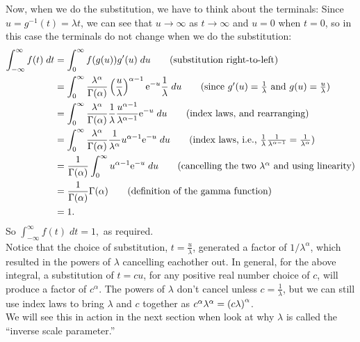 \noindent Now, when we do the substitution, we have to think about the terminals: Since $u = g^{-1}(t) = \lambda t$, we can see that $u \rightarrow \infty$ as $t \rightarrow \infty$ and $u = 0$ when $t = 0$, so in this case the terminals do not change when we do the substitution: 
\begin{align*}
\int_{-\infty}^\infty f(t) \; dt & = \int_0^\infty f(g(u))g'(u) \; du \tag{substitution right-to-left} \\
	& = \int_0^\infty \frac{\lambda^\alpha}{\Gamma(\alpha)}\brac{\frac{u}{\lambda}}^{\alpha - 1} \e^{-u} \frac{1}{\lambda} \; du \tag{since $g'(u) = \frac{1}{\lambda}$ and $g(u) = \frac{u}{\lambda}$} \\
	& = \int_0^\infty \frac{\lambda^\alpha}{\Gamma(\alpha)}\frac{1}{\lambda}\frac{u^{\alpha - 1}}{\lambda^{\alpha - 1}} \e^{-u} \; du  \tag{index laws, and rearranging} \\
	& = \int_0^\infty \frac{\lambda^\alpha}{\Gamma(\alpha)}\frac{1}{\lambda^\alpha} u^{\alpha - 1} \e^{-u} \; du  \tag{index laws, i.e., $\frac{1}{\lambda}\frac{1}{\lambda^{\alpha - 1}} = \frac{1}{\lambda^\alpha}$} \\
	& = \frac{1}{\Gamma(\alpha)} \int_0^\infty u^{\alpha - 1} \e^{-u} \; du  \tag{cancelling the two $\lambda^\alpha$ and using linearity} \\
	& = \frac{1}{\Gamma(\alpha)}\Gamma(\alpha) \tag{definition of the gamma function} \\
	& = 1.
\end{align*}
So $\int_{-\infty}^\infty f(t) \; dt = 1,$ as required. \\

\noindent Notice that the choice of substitution, $t = \frac{u}{\lambda}$, generated a factor of $1/\lambda^\alpha$, which resulted in the powers of $\lambda$ cancelling eachother out. In general, for the above integral, a substitution of $t = cu$, for any positive real number choice of $c$, will produce a factor of $c^\alpha$. The powers of $\lambda$ don't cancel unless $c = \frac{1}{\lambda}$, but we can still use index laws to bring $\lambda$ and $c$ together as $c^\alpha \lambda^\alpha = \left(c \lambda\right)^\alpha$. \\

\noindent We will see this in action in the next section when look at why $\lambda$ is called the ``inverse scale parameter.''

